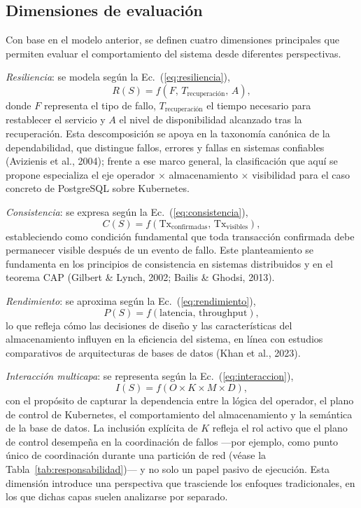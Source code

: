 \documentclass[12pt,twocolumn,letterpaper]{article}
\newcommand{\Ec}[1]{Ec.~(\ref{#1})}
\begin{document}
\subsection{Dimensiones de evaluación}
Con base en el modelo anterior, se definen cuatro dimensiones principales que permiten evaluar el comportamiento del sistema desde diferentes perspectivas.

\textit{Resiliencia}: se modela según la \Ec{eq:resiliencia},
\begin{equation}\label{eq:resiliencia}
R(S) = f(F,\, T_{\text{recuperación}},\, A),
\end{equation}
donde $F$ representa el tipo de fallo, $T_{\text{recuperación}}$ el tiempo necesario para restablecer el servicio y $A$ el nivel de disponibilidad alcanzado tras la recuperación. Esta descomposición se apoya en la taxonomía canónica de la dependabilidad, que distingue fallos, errores y fallas en sistemas confiables (Avizienis et al., 2004); frente a ese marco general, la clasificación que aquí se propone especializa el eje operador $\times$ almacenamiento $\times$ visibilidad para el caso concreto de PostgreSQL sobre Kubernetes.

\textit{Consistencia}: se expresa según la \Ec{eq:consistencia},
\begin{equation}\label{eq:consistencia}
C(S) = f(\text{Tx}_{\text{confirmadas}},\, \text{Tx}_{\text{visibles}}),
\end{equation}
estableciendo como condición fundamental que toda transacción confirmada debe permanecer visible después de un evento de fallo. Este planteamiento se fundamenta en los principios de consistencia en sistemas distribuidos y en el teorema CAP (Gilbert \& Lynch, 2002; Bailis \& Ghodsi, 2013).

\textit{Rendimiento}: se aproxima según la \Ec{eq:rendimiento},
\begin{equation}\label{eq:rendimiento}
P(S) = f(\text{latencia},\, \text{throughput}),
\end{equation}
lo que refleja cómo las decisiones de diseño y las características del almacenamiento influyen en la eficiencia del sistema, en línea con estudios comparativos de arquitecturas de bases de datos (Khan et al., 2023).

\textit{Interacción multicapa}: se representa según la \Ec{eq:interaccion},
\begin{equation}\label{eq:interaccion}
I(S) = f(O \times K \times M \times D),
\end{equation}
con el propósito de capturar la dependencia entre la lógica del operador, el plano de control de Kubernetes, el comportamiento del almacenamiento y la semántica de la base de datos. La inclusión explícita de $K$ refleja el rol activo que el plano de control desempeña en la coordinación de fallos —por ejemplo, como punto único de coordinación durante una partición de red (véase la Tabla~\ref{tab:responsabilidad})— y no solo un papel pasivo de ejecución. Esta dimensión introduce una perspectiva que trasciende los enfoques tradicionales, en los que dichas capas suelen analizarse por separado.
\end{document}
